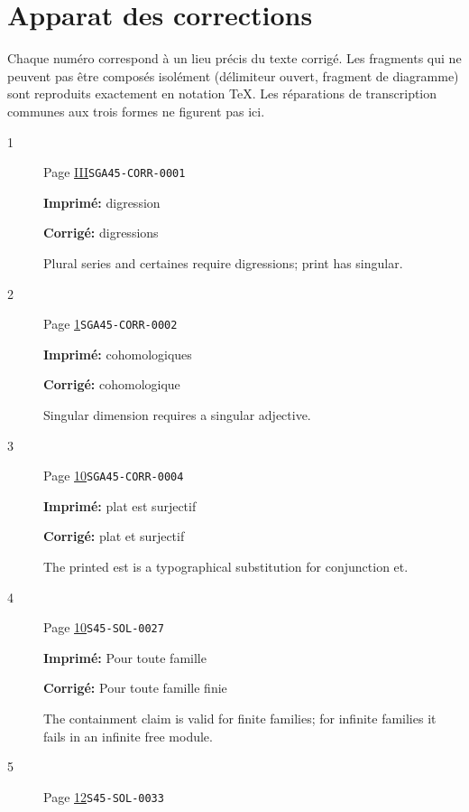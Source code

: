 \ifnum{}\relax
\clearpage
\chapter*{Apparat des corrections}
Chaque numéro correspond à un lieu précis du texte corrigé. Les fragments qui ne peuvent pas être composés isolément (délimiteur ouvert, fragment de diagramme) sont reproduits exactement en notation TeX. Les réparations de transcription communes aux trois formes ne figurent pas ici.
\begingroup\small
\begin{description}
\item[\hypertarget{apparatus:FR-0001}{1}] Page \hyperlink{printpage:fr:III}{III}\quad\texttt{SGA45-CORR-0001}
\par\noindent\textbf{Imprimé:} digression
\par\noindent\textbf{Corrigé:} digressions
\par\noindent Plural series and certaines require digressions; print has singular.
\smallskip
\item[\hypertarget{apparatus:FR-0002}{2}] Page \hyperlink{printpage:fr:1}{1}\quad\texttt{SGA45-CORR-0002}
\par\noindent\textbf{Imprimé:} cohomologiques
\par\noindent\textbf{Corrigé:} cohomologique
\par\noindent Singular dimension requires a singular adjective.
\smallskip
\item[\hypertarget{apparatus:FR-0003}{3}] Page \hyperlink{printpage:fr:10}{10}\quad\texttt{SGA45-CORR-0004}
\par\noindent\textbf{Imprimé:} plat est surjectif
\par\noindent\textbf{Corrigé:} plat et surjectif
\par\noindent The printed est is a typographical substitution for conjunction et.
\smallskip
\item[\hypertarget{apparatus:FR-0004}{4}] Page \hyperlink{printpage:fr:10}{10}\quad\texttt{S45-SOL-0027}
\par\noindent\textbf{Imprimé:} Pour toute famille
\par\noindent\textbf{Corrigé:} Pour toute famille finie
\par\noindent The containment claim is valid for finite families; for infinite families it fails in an infinite free module.
\smallskip
\item[\hypertarget{apparatus:FR-0005}{5}] Page \hyperlink{printpage:fr:12}{12}\quad\texttt{S45-SOL-0033}

\end{description}
